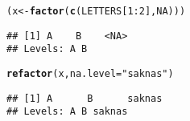 \documentclass{article}\usepackage[]{graphicx}\usepackage[]{color}
\makeatletter
\newcommand{\hlnum}[1]{\textcolor[rgb]{0.686,0.059,0.569}{#1}}%
\newcommand{\hlstr}[1]{\textcolor[rgb]{0.192,0.494,0.8}{#1}}%
\newcommand{\hlopt}[1]{\textcolor[rgb]{0,0,0}{#1}}%
\newcommand{\hlstd}[1]{\textcolor[rgb]{0.345,0.345,0.345}{#1}}%
\newcommand{\hlkwb}[1]{\textcolor[rgb]{0.69,0.353,0.396}{#1}}%
\newcommand{\hlkwc}[1]{\textcolor[rgb]{0.333,0.667,0.333}{#1}}%
\newcommand{\hlkwd}[1]{\textcolor[rgb]{0.737,0.353,0.396}{\textbf{#1}}}%
\newenvironment{kframe}{%
 \def\at@end@of@kframe{}%
 \ifinner\ifhmode%
  \def\at@end@of@kframe{\end{minipage}}%
  \begin{minipage}{\columnwidth}%
 \fi\fi%
 \def\FrameCommand##1{\hskip\@totalleftmargin \hskip-\fboxsep
 \colorbox{shadecolor}{##1}\hskip-\fboxsep
     \hskip-\linewidth \hskip-\@totalleftmargin \hskip\columnwidth}%
 \MakeFramed {\advance\hsize-\width
   \@totalleftmargin\z@ \linewidth\hsize
   \@setminipage}}%
 {\par\unskip\endMakeFramed%
 \at@end@of@kframe}
\newenvironment{knitrout}{}{} %
\makeatother
\begin{document}
\begin{knitrout}
\color{fgcolor}\begin{kframe}
\begin{alltt}
\hlstd{(x} \hlkwb{<-} \hlkwd{factor}\hlstd{(}\hlkwd{c}\hlstd{(LETTERS[}\hlnum{1}\hlopt{:}\hlnum{2}\hlstd{],}\hlnum{NA}\hlstd{)))}
\end{alltt}
\begin{verbatim}
## [1] A    B    <NA>
## Levels: A B
\end{verbatim}
\begin{alltt}
\hlkwd{refactor}\hlstd{(x,}\hlkwc{na.level}\hlstd{=}\hlstr{"saknas"}\hlstd{)}
\end{alltt}
\begin{verbatim}
## [1] A      B      saknas
## Levels: A B saknas
\end{verbatim}
\end{kframe}
\end{knitrout}
\end{document}

